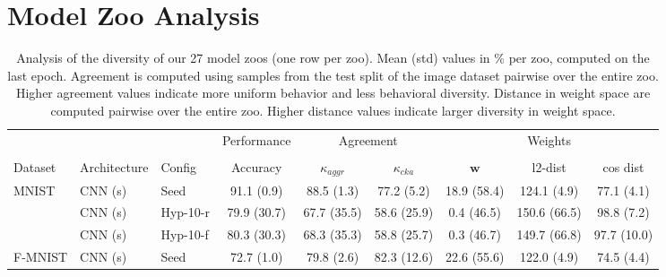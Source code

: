


\section{Model Zoo Analysis}
\label{sec:analysis}
%
\begin{table}[]
{
\centering
\scriptsize
\caption{Analysis of the diversity of our 27 model zoos (one row per zoo). Mean (std) values in \% per zoo, computed on the last epoch. Agreement is computed using samples from the test split of the image dataset pairwise over the entire zoo. Higher agreement values indicate more uniform behavior and less behavioral diversity. Distance in weight space are computed pairwise over the entire zoo. Higher distance values indicate larger diversity in weight space.}
\label{tab:analysis}
{
\begin{center}
\centering
\begin{tabular}{@{}lllcccccc@{}}
\toprule
                               &               &               & Performance & \multicolumn{2}{c}{Agreement}    & \multicolumn{3}{c}{Weights}               \\ 
\cmidrule(rl){4-4} \cmidrule(rl){5-6} \cmidrule(rl){7-9} \\
Dataset                        & Architecture  & Config & Accuracy    & $\kappa_{aggr}$ & $\kappa_{cka}$ & $\mathbf{w}$           & l2-dist       & cos dist    \\
\cmidrule(r){1-1} \cmidrule(rl){2-2}  \cmidrule(rl){3-3} \cmidrule(rl){4-4} \cmidrule(rl){5-6} \cmidrule(rl){7-9}
\multirow{3}{*}{MNIST}         & CNN (s)   & Seed          & 91.1 (0.9)  & 88.5 (1.3)      & 77.2 (5.2)     & 18.9 (58.4) & 124.1 (4.9)   & 77.1 (4.1)  \\
                               & CNN (s)   & Hyp-10-r   & 79.9 (30.7) & 67.7 (35.5)     & 58.6 (25.9)    & 0.4 (46.5)  & 150.6 (66.5)  & 98.8 (7.2)  \\
                               & CNN (s)   & Hyp-10-f    & 80.3 (30.3) & 68.3 (35.3)     & 58.8 (25.7)    & 0.3 (46.7)  & 149.7 (66.8)  & 97.7 (10.0) \\
\cmidrule(r){1-1} \cmidrule(rl){2-2}  \cmidrule(rl){3-3} \cmidrule(rl){4-4} \cmidrule(rl){5-6} \cmidrule(rl){7-9}
\multirow{3}{*}{F-MNIST}       & CNN (s)   & Seed          & 72.7 (1.0)  & 79.8 (2.6)      & 82.3 (12.6)    & 22.6 (55.6) & 122.0 (4.9)   & 74.5 (4.4)  \\

\end{tabular}
\end{center}}}
\end{table}
